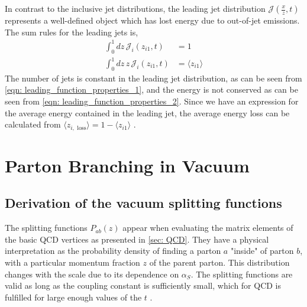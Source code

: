 \documentclass[main.tex]{subfiles}
\begin{document}
In contrast to the inclusive jet distributions, the leading jet distribution \(\mathcal{J}(\frac{x}{z},t)\) represents a well-defined object which has lost energy due to out-of-jet emissions. The  sum rules for the leading jets is,
\begin{align}
    \int_0^1 dz\, \mathcal{J}_i(z_{i1},t) &= 1 \label{eqn: leading_function_properties_1}\\
    \int_0^1 dz\, z\,  \mathcal{J}_i(z_{i1},t) &= \langle z_{i1}\rangle  \label{eqn: leading_function_properties_2}
\end{align}
The number of jets is constant in the leading jet distribution, as can be seen from \autoref{eqn: leading_function_properties_1}, and the energy is not conserved as can be seen from \autoref{eqn: leading_function_properties_2}. Since we have an expression for the average energy contained in the leading jet, the average energy loss can be calculated from \(\langle z_{i,\text{ loss}} \rangle = 1 -\langle z_{i1}\rangle\) \cite{Neill_2021}. 


\section{Parton Branching in Vacuum}
\subsection{Derivation of the vacuum splitting functions}\label{sec: derivation_splitting_functions_vacuum}
The splitting functions \(P_{ab}(z)\) appear when evaluating the matrix elements of the basic QCD vertices as presented in \autoref{sec: QCD}. They have a physical interpretation as the probability density of finding a parton \(a\) "inside" of parton \(b\), with a particular momentum fraction \(z\) of the parent parton. This distribution changes with the scale due to its dependence on \(\alpha_S\). The splitting functions are valid as long as the coupling constant is sufficiently small, which for QCD is fulfilled for large enough values of the \(t\) \cite{AltarelliParisi_original, ellis_stirling_webber_1996}.
\end{document}
